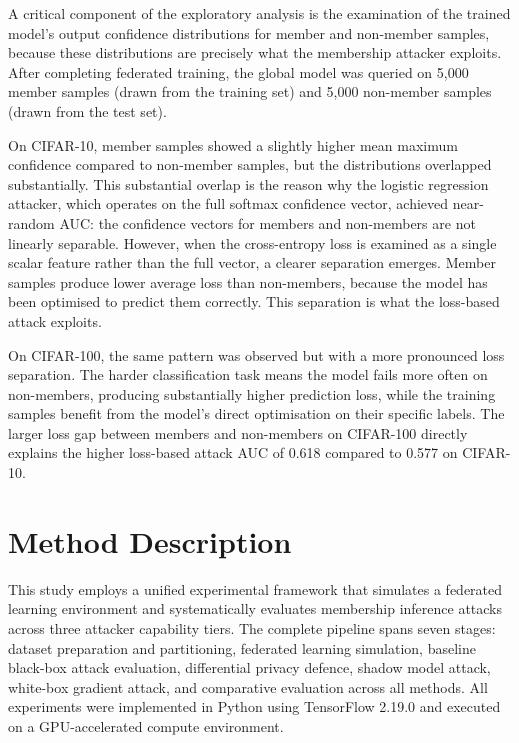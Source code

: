 \documentclass[12pt, a4paper]{report}
\begin{document}
A critical component of the exploratory analysis is the examination of the trained
model's output confidence distributions for member and non-member samples, because
these distributions are precisely what the membership attacker exploits. After
completing federated training, the global model was queried on 5,000 member samples
(drawn from the training set) and 5,000 non-member samples (drawn from the test
set).

On CIFAR-10, member samples showed a slightly higher mean maximum confidence
compared to non-member samples, but the distributions overlapped substantially.
This substantial overlap is the reason why the logistic regression attacker, which
operates on the full softmax confidence vector, achieved near-random AUC: the
confidence vectors for members and non-members are not linearly separable. However,
when the cross-entropy loss is examined as a single scalar feature rather than the
full vector, a clearer separation emerges. Member samples produce lower average loss
than non-members, because the model has been optimised to predict them correctly.
This separation is what the loss-based attack exploits.

On CIFAR-100, the same pattern was observed but with a more pronounced loss
separation. The harder classification task means the model fails more often on
non-members, producing substantially higher prediction loss, while the training
samples benefit from the model's direct optimisation on their specific labels.
The larger loss gap between members and non-members on CIFAR-100 directly explains
the higher loss-based attack AUC of 0.618 compared to 0.577 on CIFAR-10.

\chapter{Method Description}

This study employs a unified experimental framework that simulates a federated
learning environment and systematically evaluates membership inference attacks
across three attacker capability tiers. The complete pipeline spans seven stages:
dataset preparation and partitioning, federated learning simulation, baseline
black-box attack evaluation, differential privacy defence, shadow model attack,
white-box gradient attack, and comparative evaluation across all methods. All
experiments were implemented in Python using TensorFlow 2.19.0 and executed on
a GPU-accelerated compute environment.
\end{document}

